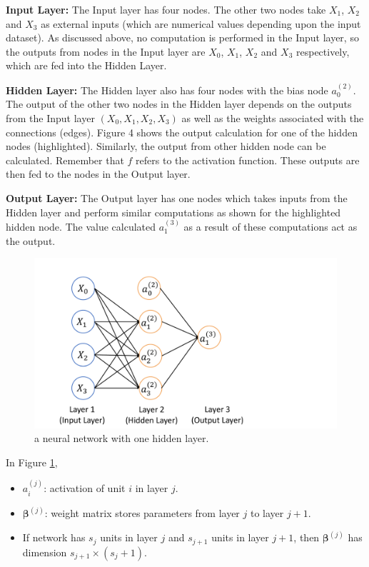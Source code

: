 \documentclass[]{book}
\providecommand{\tightlist}{%
  \setlength{\itemsep}{0pt}\setlength{\parskip}{0pt}}
\begin{document}
\textbf{Input Layer:} The Input layer has four nodes. The other two
nodes take \(X_1\), \(X_2\) and \(X_3\) as external inputs (which are
numerical values depending upon the input dataset). As discussed above,
no computation is performed in the Input layer, so the outputs from
nodes in the Input layer are \(X_0\), \(X_1\), \(X_2\) and \(X_3\)
respectively, which are fed into the Hidden Layer.

\textbf{Hidden Layer:} The Hidden layer also has four nodes with the
bias node \(a_0^{(2)}\). The output of the other two nodes in the Hidden
layer depends on the outputs from the Input layer
\((X_0, X_1, X_2, X_3)\) as well as the weights associated with the
connections (edges). Figure 4 shows the output calculation for one of
the hidden nodes (highlighted). Similarly, the output from other hidden
node can be calculated. Remember that \(f\) refers to the activation
function. These outputs are then fed to the nodes in the Output layer.

\textbf{Output Layer:} The Output layer has one nodes which takes inputs
from the Hidden layer and perform similar computations as shown for the
highlighted hidden node. The value calculated \(a_1^{(3)}\) as a result
of these computations act as the output.

\begin{figure}

{\centering \includegraphics[width=0.75\linewidth]{figures/NN_2} 

}

\caption{a neural network with one hidden layer.}\label{fig:NN2}
\end{figure}

In Figure \ref{fig:NN2},

\begin{itemize}
\tightlist
\item
  \(a^{(j)}_i\): activation of unit \(i\) in layer \(j\).
\item
  \(\boldsymbol{\beta}^{(j)}\): weight matrix stores parameters from
  layer \(j\) to layer \(j+1\).
\item
  If network has \(s_j\) units in layer \(j\) and \(s_{j+1}\) units in
  layer \(j+1\), then \(\boldsymbol{\beta}^{(j)}\) has dimension
  \(s_{j+1} \times (s_j+1)\).
\end{itemize}
\end{document}
